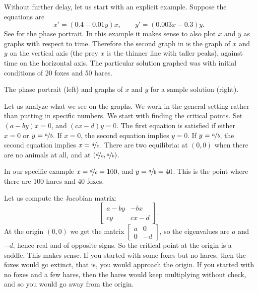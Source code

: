 Without further delay, let us start with an explicit example.  Suppose the
equations are 
\begin{equation*}
x' = (0.4-0.01y)x, \qquad y' = (0.003x-0.3)y .
\end{equation*}
See  for the phase portrait.  In this example
it makes sense to also plot $x$ and $y$ as graphs with respect to time.
Therefore the second graph in 
 is the graph of $x$ and $y$ on the vertical
axis (the prey $x$ is the thinner line with taller peaks), against time
on the horizontal axis.  The particular solution graphed was with initial
conditions of 20 foxes and 50 hares.
\begin{myfig}
\capstart
\caption{The phase portrait (left) and graphs of $x$ and $y$ for
a sample solution (right). \label{fig:nlin-pred-prey}}
\end{myfig}

Let us analyze what we see on the graphs.  We work in the general
setting rather than putting in specific numbers.  We start with finding
the critical points.  Set $(a-by)x = 0$, and $(cx-d)y = 0$.
The first equation is satisfied if either $x=0$ or $y=\nicefrac{a}{b}$.  If $x=0$, the
second equation implies $y=0$.  If $y= \nicefrac{a}{b}$, the second equation implies
$x=\nicefrac{d}{c}$.
There are two equilibria: at $(0,0)$ when there are no animals at all, and at
$(\nicefrac{d}{c},\nicefrac{a}{b})$.  

In our specific example $x = \nicefrac{d}{c} = 100$, and $y = \nicefrac{a}{b} = 40$.
This is the point where there are 100 hares and 40 foxes.

Let us compute the Jacobian matrix:
\begin{equation*}
\begin{bmatrix}
a-by & -bx \\
cy & cx-d
\end{bmatrix} .
\end{equation*}
At the origin $(0,0)$ we get the matrix
$\left[ \begin{smallmatrix}
a & 0 \\
0 & -d
\end{smallmatrix} \right]$, so the eigenvalues are $a$ and $-d$, hence real
and of opposite signs.  So the critical point at the origin is a saddle.
This makes sense.  If you started with some foxes but no hares, then the
foxes would go extinct, that is, you would approach the origin.  If you
started with no foxes and a few hares, then the hares would keep multiplying
without check, and so you would go away from the origin.

